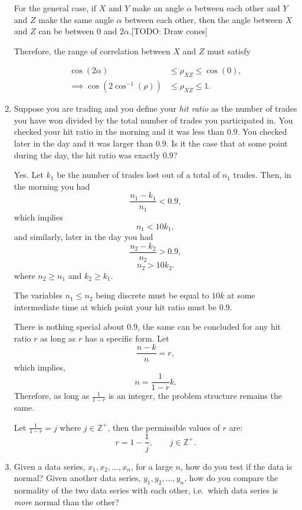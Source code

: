 \documentclass{amsart}
\theoremstyle{plain}
\numberwithin{equation}{section}
\begin{document}
\begin{enumerate}
For the general case, if $X$ and $Y$ make an angle 
$\alpha$ between each other and $Y$ and $Z$ make the 
same angle $\alpha$ between each other, 
then the angle between $X$ and $Z$ can be between 
$0$ and $2\alpha$.[TODO: Draw cones]

Therefore, the range of correlation between 
$X$ and $Z$ must satisfy

\begin{align*}
\cos\left(2\alpha\right) &\leq \rho_{XZ} \leq \cos\left( 0 \right),\\
\implies \cos\left(2 \cos^{-1} \left(\rho\right) \right) & \leq \rho_{XZ} \leq 1.
\end{align*}

\item Suppose you are trading and you define 
your \emph{hit ratio} as the number of trades you have 
won divided by the total number of trades you 
participated in.
You checked your hit ratio in the morning 
and it was less than $0.9$. You checked later
in the day and it was larger than $0.9$. Is it the 
case that at some point during the day, the hit 
ratio was exactly $0.9$?

Yes. Let $k_1$ be the number of trades lost out of a total of $n_1$
trades. Then, in the morning you had
$$ \frac{n_1-k_1}{n_1} < 0.9,$$
which implies 
$$n_1 < 10k_1,$$ 
and similarly, later in the day you had
$$ \frac{n_2-k_2}{n_2} > 0.9,$$
$$n_2 > 10k_2.$$ 
where $n_2 \geq n_1$ and $k_2\geq k_1$.


The variables $n_1 \leq n_2$ being discrete must be equal 
to $10k$ at some intermediate time at which point 
your hit ratio must be $0.9$.

There is nothing special about $0.9$, the same can 
be concluded for any hit ratio $r$ as long as $r$ has a 
specific form. Let
$$\frac{n-k}{n} = r,$$ which 
implies,
$$ n = \frac{1}{1-r} k.$$
Therefore, as long as $\frac{1}{1-r}$ is an integer,
the problem structure remains the same. 

Let $\frac{1}{1-r} = j$ where $j \in \mathbb{Z^+}$, then
the permissible values of $r$ are:
$$r  = 1 - \frac{1}{j}, \qquad j \in \mathbb{Z^+}.$$

\item Given a data series, $x_1, x_2, \ldots, x_n$, for 
a large $n$, how do you test if the data is normal? Given 
another data series, $y_1, y_2, \ldots, y_n$, how do you 
compare the normality of the two data series with each other, 
i.e.\ which data series is \emph{more} normal than the other?


\end{enumerate}
\end{document}
